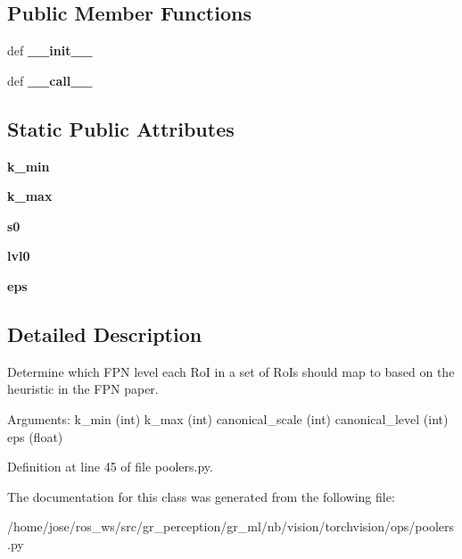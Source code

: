 \subsection*{Public Member Functions}
\begin{DoxyCompactItemize}
\item 
\mbox{\label{classtorchvision_1_1ops_1_1poolers_1_1LevelMapper_a3d8ca1f1643894dc1430042ac6b13c29}} 
def {\bfseries \+\_\+\+\_\+init\+\_\+\+\_\+}
\item 
\mbox{\label{classtorchvision_1_1ops_1_1poolers_1_1LevelMapper_a7fb28ac0763f793ab4070615c0333ab3}} 
def {\bfseries \+\_\+\+\_\+call\+\_\+\+\_\+}
\end{DoxyCompactItemize}
\subsection*{Static Public Attributes}
\begin{DoxyCompactItemize}
\item 
\mbox{\label{classtorchvision_1_1ops_1_1poolers_1_1LevelMapper_a2b18637e85ae43722bbb0f97781b6341}} 
{\bfseries k\+\_\+min}
\item 
\mbox{\label{classtorchvision_1_1ops_1_1poolers_1_1LevelMapper_a8f73962e4d90215f4b0055149a47b210}} 
{\bfseries k\+\_\+max}
\item 
\mbox{\label{classtorchvision_1_1ops_1_1poolers_1_1LevelMapper_abb1cc1568864aa6058fa2c40fb0b3b55}} 
{\bfseries s0}
\item 
\mbox{\label{classtorchvision_1_1ops_1_1poolers_1_1LevelMapper_a35f42dad846baca90be77e098fcedc28}} 
{\bfseries lvl0}
\item 
\mbox{\label{classtorchvision_1_1ops_1_1poolers_1_1LevelMapper_aca00297130d4ecfc9a0e858ad5da1af6}} 
{\bfseries eps}
\end{DoxyCompactItemize}


\subsection{Detailed Description}
\begin{DoxyVerb}Determine which FPN level each RoI in a set of RoIs should map to based
on the heuristic in the FPN paper.

Arguments:
    k_min (int)
    k_max (int)
    canonical_scale (int)
    canonical_level (int)
    eps (float)
\end{DoxyVerb}
 

Definition at line 45 of file poolers.\+py.



The documentation for this class was generated from the following file\+:\begin{DoxyCompactItemize}
\item 
/home/jose/ros\+\_\+ws/src/gr\+\_\+perception/gr\+\_\+ml/nb/vision/torchvision/ops/poolers.\+py\end{DoxyCompactItemize}
